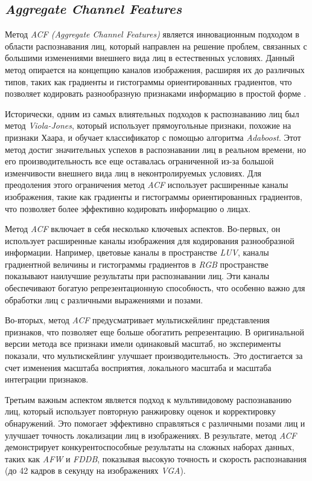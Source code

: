 \subsection{\textit{Aggregate Channel Features}}
Метод \textit{ACF (Aggregate Channel Features)} является инновационным подходом в области распознавания лиц, который направлен на решение проблем, связанных с большими изменениями внешнего вида лиц в естественных условиях. Данный метод опирается на концепцию каналов изображения, расширяя их до различных типов, таких как градиенты и гистограммы ориентированных градиентов, что позволяет кодировать разнообразную признаками информацию в простой форме \cite{ACF}.

Исторически, одним из самых влиятельных подходов к распознаванию лиц был метод \textit{Viola-Jones}, который использует прямоугольные признаки, похожие на признаки Хаара, и обучает классификатор с помощью алгоритма \textit{Adaboost}. Этот метод достиг значительных успехов в распознавании лиц в реальном времени, но его производительность все еще оставалась ограниченной из-за большой изменчивости внешнего вида лиц в неконтролируемых условиях. Для преодоления этого ограничения метод \textit{ACF} использует расширенные каналы изображения, такие как градиенты и гистограммы ориентированных градиентов, что позволяет более эффективно кодировать информацию о лицах.

Метод \textit{ACF} включает в себя несколько ключевых аспектов. Во-первых, он использует расширенные каналы изображения для кодирования разнообразной информации. Например, цветовые каналы в пространстве \textit{LUV}, каналы градиентной величины и гистограммы градиентов в \textit{RGB} пространстве показывают наилучшие результаты при распознавании лиц. Эти каналы обеспечивают богатую репрезентационную способность, что особенно важно для обработки лиц с различными выражениями и позами.

Во-вторых, метод \textit{ACF} предусматривает мультискейлинг представления признаков, что позволяет еще больше обогатить репрезентацию. В оригинальной версии метода все признаки имели одинаковый масштаб, но эксперименты показали, что мультискейлинг улучшает производительность. Это достигается за счет изменения масштаба восприятия, локального масштаба и масштаба интеграции признаков.

Третьим важным аспектом является подход к мультивидовому распознаванию лиц, который использует повторную ранжировку оценок и корректировку обнаружений. Это помогает эффективно справляться с различными позами лиц и улучшает точность локализации лиц в изображениях. В результате, метод \textit{ACF} демонстрирует конкурентоспособные результаты на сложных наборах данных, таких как \textit{AFW} и \textit{FDDB}, показывая высокую точность и скорость распознавания (до 42 кадров в секунду на изображениях \textit{VGA}).

